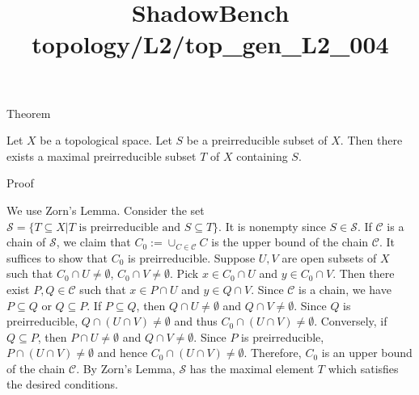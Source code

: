 \documentclass{article}
\title{ShadowBench topology/L2/top\_gen\_L2\_004}
\begin{document}
\maketitle

Theorem

Let $X$ be a topological space. Let $S$ be a preirreducible subset of $X$. Then there exists a maximal preirreducible subset $T$ of $X$ containing $S$.

Proof

We use Zorn's Lemma. Consider the set $\mathcal{S} = \{T \subseteq X | T \text{ is preirreducible and } S \subseteq T\}$. It is nonempty since $S \in \mathcal{S}$.
If $\mathcal{C}$ is a chain of $\mathcal{S}$, we claim that $C_0:=\cup_{C \in \mathcal{C}} C$ is the upper bound of the chain $\mathcal{C}$.
It suffices to show that $C_0$ is preirreducible. Suppose $U,V$ are open subsets of $X$ such that $C_0 \cap U \ne \emptyset$, $C_0 \cap V \ne \emptyset$.
Pick $x \in C_0 \cap U$ and $y \in C_0 \cap V$. Then there exist $P,Q \in \mathcal{C}$ such that $x \in P \cap U$ and $y \in Q \cap V$.
Since $\mathcal{C}$ is a chain, we have $P \subseteq Q$ or $Q \subseteq P$.
If $P \subseteq Q$, then $Q \cap U \ne \emptyset$ and $Q \cap V \ne \emptyset$. Since $Q$ is preirreducible, $Q \cap (U \cap V) \ne \emptyset$ and thus $C_0 \cap (U \cap V) \ne \emptyset$.
Conversely, if $ Q \subseteq P$, then $P \cap U \ne \emptyset$ and $Q \cap V \ne \emptyset$. Since $P$ is preirreducible, $P \cap (U \cap V) \ne \emptyset$ and hence $C_0 \cap (U \cap V) \ne \emptyset$.
Therefore, $C_0$ is an upper bound of the chain $\mathcal{C}$. By Zorn's Lemma, $\mathcal{S}$ has the maximal element $T$ which satisfies the desired conditions.
\end{document}
